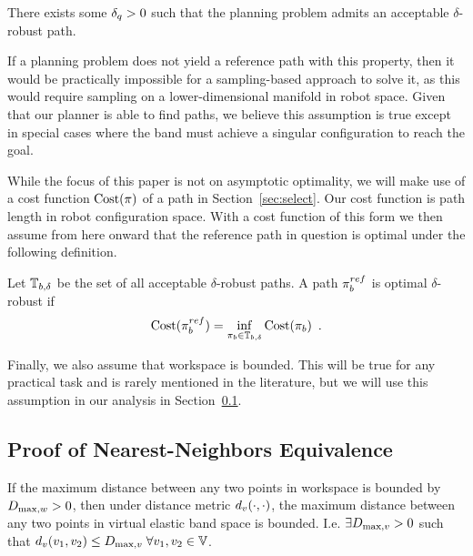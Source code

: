 \begin{assumption}
    There exists some $\delta_q > 0$ such that the planning problem admits an acceptable $\delta$-robust path.
    \label{ass:solvable_problem}
\end{assumption}

If a planning problem does not yield a reference path with this property, then it would be practically impossible for a sampling-based approach to solve it, as this would require sampling on a lower-dimensional manifold in robot space. Given that our planner is able to find paths, we believe this assumption is true except in special cases where the band must achieve a singular configuration to reach the goal.


While the focus of this paper is not on asymptotic optimality, we will make use of a cost function $\textrm{Cost}(\pi)$ of a path in Section~\ref{sec:select}. Our cost function is path length in robot configuration space. With a cost function of this form we then assume from here onward that the reference path in question is optimal under the following definition.

\begin{definition}
    Let $\mathbb{T}_{b,\delta}$ be the set of all acceptable $\delta$-robust paths. A path $\pi_{b}^{ref}$ is optimal $\delta$-robust if
    \begin{equation}
        \textrm{Cost}(\pi_{b}^{ref}) = \inf_{\pi_{b} \in \mathbb{T}_{b,\delta}} \textrm{Cost}(\pi_{b}) \enspace .
    \end{equation}
\end{definition}

Finally, we also assume that workspace is bounded. This will be true for any practical task and is rarely mentioned in the literature, but we will use this assumption in our analysis in Section~\ref{sec:nn_equiv}.

\subsection{Proof of Nearest-Neighbors Equivalence}
\label{sec:nn_equiv}

\begin{lemma}
    \label{lem:banddist}
     If the maximum distance between any two points in workspace is bounded by $D_{\textrm{max}, w} > 0$, then under distance metric $d_v(\cdot, \cdot)$, the maximum distance between any two points in virtual elastic band space is bounded. I.e. $\exists D_{\textrm{max},v} > 0$ such that $d_v(v_1, v_2) \leq D_{\textrm{max},v} \; \forall v_1, v_2 \in \mathbb{V}$.
\end{lemma}

